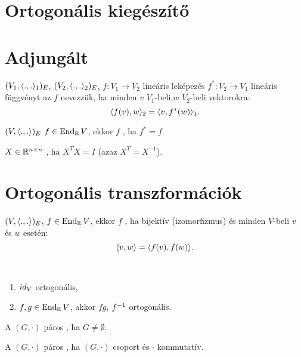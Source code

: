 \section{Ortogonális kiegészítő}

\section{Adjungált}
\begin{ff}
	$(V_1,\langle.,.\rangle_1)_E$, $(V_2,\langle.,.\rangle_2)_E$, $f:V_1\to V_2$ lineáris leképezés
	$f^*:V_2\to V_1$ lineáris függvényt az $f$  nevezzük, ha
	minden $v$ $V_1$-beli,$w$ $V_2$-beli vektorokra:
	\begin{equation*}
		\langle f(v),w\rangle_2=\langle v,f^*(w)\rangle_1.
	\end{equation*}
\end{ff}
\begin{ff}
	$(V,\langle.,.\rangle)_E$ $f\in\operatorname{End}_{\mathbb{R}} V$, ekkor $f$ , ha $f^*=f$.
\end{ff}
\begin{ff}
	$X\in\mathbb{R}^{n\times n}$ , ha $X^TX=I$ (azaz $X^T=X^{-1}$).
\end{ff}

\section{Ortogonális transzformációk}
\begin{ff}
	$(V,\langle.,.\rangle)_E$, $f\in\operatorname{End}_{\mathbb{R}} V$, ekkor $f$ , ha
	bijektív (izomorfizmus) és minden $V$-beli $v$ és $w$ esetén:
	\begin{equation*}
		\langle v,w\rangle=\langle f(v),f(w)\rangle.
	\end{equation*}
\end{ff}

\begin{all}
	~\begin{enumerate}
		\item $id_V$ ortogonális,
		\item $f,g\in\operatorname{End}_{\mathbb{R}} V$, akkor $fg$, $f^{-1}$ ortogonális.
	\end{enumerate}
\end{all}

\begin{ff}
	A $(G,\cdot)$ páros , ha $G\neq\emptyset$.
\end{ff}
\begin{ff}
	A $(G,\cdot)$ páros , ha $(G,\cdot)$ csoport és $\cdot$ 
	kommutatív.
\end{ff}

